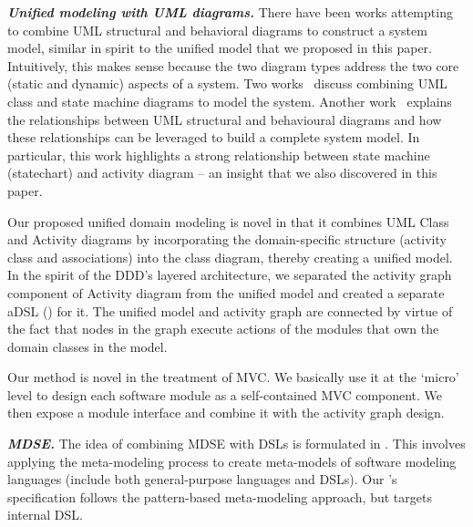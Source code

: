 \textbf{\textit{Unified modeling with UML diagrams.}}
There have been works attempting to combine UML structural and behavioral diagrams to construct a system model, similar in spirit to the unified model that we proposed in this paper. Intuitively, this makes sense because the two diagram types address the two core (static and dynamic) aspects of a system. Two works~\cite{kohler_integrating_2000, niaz_object-oriented_2005} discuss combining UML class and state machine diagrams to model the system. Another work~\cite{selonen_transformations_2003} explains the relationships between UML structural and behavioural diagrams and how these relationships can be leveraged to build a complete system model. In particular, this work highlights a strong relationship between state machine (\aka statechart) and activity diagram -- an insight that we also discovered in this paper. 

Our proposed unified domain modeling is novel in that it combines UML Class and Activity diagrams by incorporating the domain-specific structure (activity class and associations) into the class diagram, thereby creating a unified model. In the spirit of the DDD's layered architecture, we separated the activity graph component of Activity diagram from the unified model and created a separate aDSL (\agl) for it. The unified model and activity graph are connected by virtue of the fact that nodes in the graph execute actions of the modules that own the domain classes in the model.
%
%

Our method is novel in the treatment of MVC. We basically use it at the `micro' level to design each software module as a self-contained MVC component. We then expose a module interface and combine it with the activity graph design.

\textbf{\textit{MDSE.}}
The idea of combining MDSE with DSLs is formulated in \cite{kleppe_software_2008, brambilla_model-driven_2012}. This involves applying the meta-modeling process to create meta-models of software modeling languages (include both general-purpose languages and DSLs). 
Our \agl's specification follows the pattern-based meta-modeling approach, but targets internal DSL.


